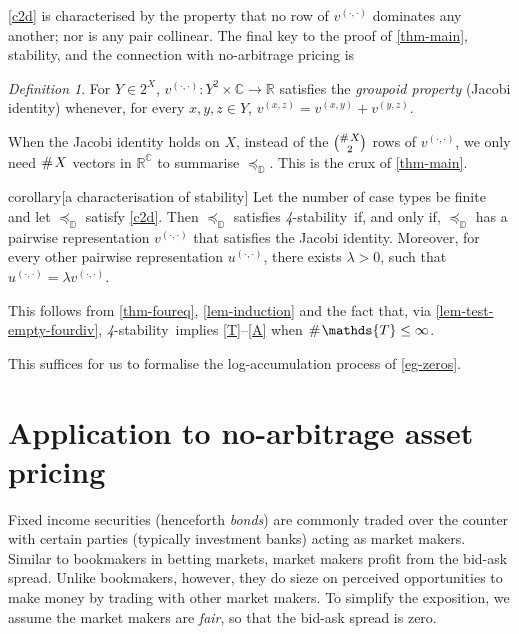 \documentclass[ecta,nameyear,draft]{econsocart}
\newcommand{\countof}{\mathbin{\#}\hskip1pt}
\newcommand{\R}{\mathbb R}
\newcommand{\preceqb}{\mathbin{\preceq}}
\newcommand{\mbbd}{{\mathds D}}
\newcommand{\mbbc}{{\mathds C}}
\newcommand{\mbbt}{{\mathds {T}}}
\newcommand{\xy}{{(x, y)}}
\newcommand{\yz}{{(y,z)}}
\newcommand{\xz}{{(x,z)}}
\newcommand{\dd}{{(\cdot,\cdot)}}
\newcommand{\stability}{\textit{4}-\textup{{stability}}}
\theoremstyle{plain}
\theoremstyle{remark}
\newtheorem*{definition*}{Definition}
\begin{document}
\ref{c2d} is characterised by the property that no row of $v^{\dd}$ dominates
any another; nor is any pair collinear.  The final key to the proof of
\cref{thm-main}, {stability}, and the connection with no-arbitrage pricing is
\begin{definition*} %
  For $Y \in 2^{X}$, $v^{\dd} : Y^{2}\times \mbbc \rightarrow \R$ satisfies the
  \emph{groupoid property} (Jacobi identity) whenever, for every $x , y , z \in
  Y$, $v^{\xz} = v^{\xy} + v^{\yz}$.
\end{definition*}
When the Jacobi identity holds on $X$, instead of the $\binom{\countof X}{2}$
rows of $v^{\dd}$, we only need $\countof X$ vectors in $\R^\mbbc$ to summarise
$\preceqb_\mbbd$. This is the crux of \cref{thm-main}.
\begin{theoremEnd}{corollary}[a characterisation of
  {stability}]\label{cor-foureq} Let the number of case types be finite and let
  $\preceq_{\mbbd}$ satisfy \ref{c2d}. Then $\preceq_{\mbbd}$ satisfies
  \stability\ if, and only if, $\preceq_{\mbbd}$ has a pairwise representation
  $v^{\dd}$ that satisfies the Jacobi identity. Moreover, for every other
  pairwise representation $u^{\dd}$, there exists $\lambda >0$, such that
  $u^{\dd} = \lambda v^{\dd}$.
\end{theoremEnd}
\begin{proofEnd}%
  This follows from \cref{thm-foureq}, \cref{lem-induction} and the fact that,
  via \cref{lem-test-empty-fourdiv}, \stability\ implies \ref{T}--\ref{A} when
  $\countof{\mbbt} \leq \infty$. \label{proof-cor-foureq}
\end{proofEnd}

This suffices for us to formalise the log-accumulation process of
\cref{eg-zeros}.

\section{Application to no-arbitrage asset pricing}\label{sec-fin-app} Fixed
income securities (henceforth \emph{bonds}) are commonly traded over the
counter with certain parties (typically investment banks) acting as market
makers. Similar to bookmakers in betting markets, market makers profit from the
bid-ask spread. Unlike bookmakers, however, they do sieze on perceived
opportunities to make money by trading with other market makers. To simplify
the exposition, we assume the market makers are \emph{fair}, so that the
bid-ask spread is zero.
\end{document}
